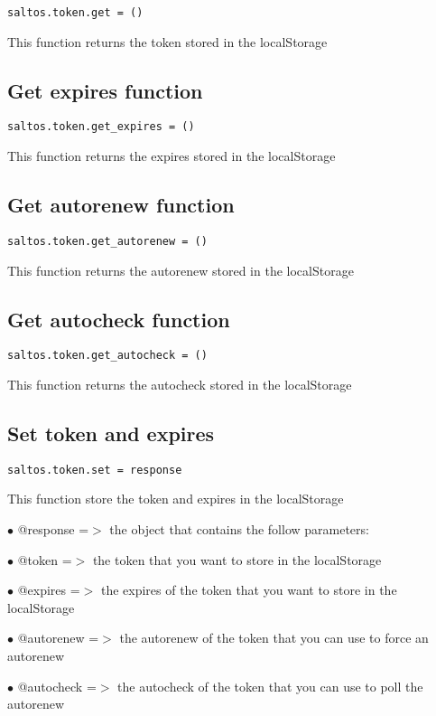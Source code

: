 \documentclass[a4paper]{book}
\begin{document}
\begin{lstlisting}
saltos.token.get = ()
\end{lstlisting}

This function returns the token stored in the localStorage

\hypertarget{toc407}{}
\subsection{Get expires function}

\begin{lstlisting}
saltos.token.get_expires = ()
\end{lstlisting}

This function returns the expires stored in the localStorage

\hypertarget{toc408}{}
\subsection{Get autorenew function}

\begin{lstlisting}
saltos.token.get_autorenew = ()
\end{lstlisting}

This function returns the autorenew stored in the localStorage

\hypertarget{toc409}{}
\subsection{Get autocheck function}

\begin{lstlisting}
saltos.token.get_autocheck = ()
\end{lstlisting}

This function returns the autocheck stored in the localStorage

\hypertarget{toc410}{}
\subsection{Set token and expires}

\begin{lstlisting}
saltos.token.set = response
\end{lstlisting}

This function store the token and expires in the localStorage

\begin{compactitem}
\item[\color{myblue}$\bullet$] @response  =$>$ the object that contains the follow parameters:
\item[\color{myblue}$\bullet$] @token     =$>$ the token that you want to store in the localStorage
\item[\color{myblue}$\bullet$] @expires   =$>$ the expires of the token that you want to store in the localStorage
\item[\color{myblue}$\bullet$] @autorenew =$>$ the autorenew of the token that you can use to force an autorenew
\item[\color{myblue}$\bullet$] @autocheck =$>$ the autocheck of the token that you can use to poll the autorenew
\end{compactitem}
\end{document}
